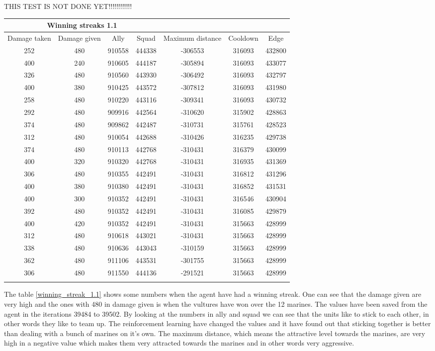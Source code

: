 
THIS TEST IS NOT DONE YET!!!!!!!!!!!!

\begin{centering}
 \begin{tabular}{|c||c|c|c|c|c|c|}
	\multicolumn{4}{c}{Winning streaks 1.1} \\
	\hline
	Damage taken & Damage given & Ally & Squad & Maximum distance & Cooldown & Edge \\
	\hline
	
	252&		480&			910558&	444338&	-306553&			316093&	432800\\
	400&		240&			910605&	444187&	-305894&			316093&	433077\\
	326&		480&			910560&	443930&	-306492&			316093&	432797\\
	400&		380&			910425&	443572&	-307812&			316093&	431980\\
	258&		480&			910220&	443116&	-309341&			316093&	430732\\
	292&		480&			909916&	442564&	-310620&			315902&	428863\\
	374&		480&			909862&	442487&	-310731&			315761&	428523\\
	312&		480&			910054&	442688&	-310426&			316235&	429738\\
	374&		480&			910113&	442768&	-310431&			316379&	430099\\
	400&		320&			910320&	442768&	-310431&			316935&	431369\\
	306&		480&			910355&	442491&	-310431&			316812&	431296\\
	400&		380&			910380&	442491&	-310431&			316852&	431531\\
	400&		300&			910352&	442491&	-310431&			316546&	430904\\
	392&		480&			910352&	442491&	-310431&			316085&	429879\\
	400&		420&			910352&	442491&	-310431&			315663&	428999\\
	312&		480&			910618&	443021&	-310431&			315663&	428999\\
	338&		480&			910636&	443043&	-310159&			315663&	428999\\
	362&		480&			911106&	443531&	-301755&			315663&	428999\\
	306&		480&			911550&	444136&	-291521&			315663&	428999\\
	\hline
	\label{winning_streak_1.1}
\end{tabular}
\end{centering}
The table \ref{winning_streak_1.1} shows some numbers when the agent have had a winning streak. One can see that the damage given are very high and the ones with 480 in damage given is when the vultures have won over the 12 marines. The values have been saved from the agent in the iterations 39484 to 39502. By looking at the numbers in ally and squad we can see that the units like to stick to each other, in other words they like to team up. The reinforcement learning have changed the values and it have found out that sticking together is better than dealing with a bunch of marines on it's own. The maximum distance, which means the attractive level towards the marines, are very high in a negative value which makes them very attracted towards the marines and in other words very aggressive. 
